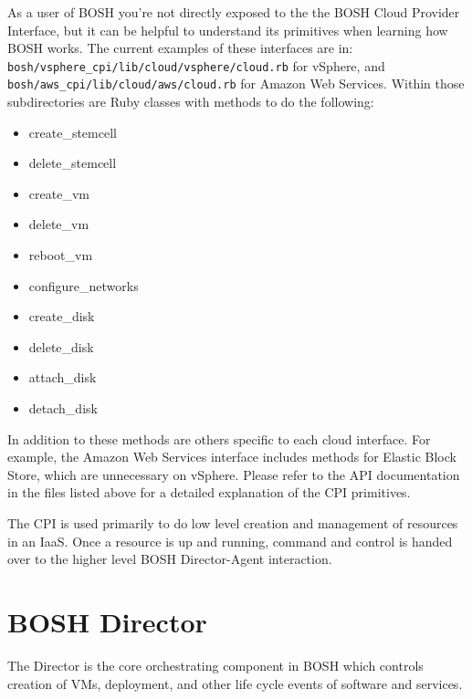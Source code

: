 As a user of BOSH you're not directly exposed to the the BOSH Cloud Provider Interface, but it can be helpful to understand its primitives when learning how BOSH works. The current examples of these interfaces are in: \texttt{bosh\slash vsphere\_cpi\slash lib\slash cloud\slash vsphere\slash cloud.rb} for vSphere, and \texttt{bosh\slash aws\_cpi\slash lib\slash cloud\slash aws\slash cloud.rb} for Amazon Web Services. Within those subdirectories are Ruby classes with methods to do the following: 

\begin{itemize}
\item create\_stemcell

\item delete\_stemcell

\item create\_vm

\item delete\_vm

\item reboot\_vm

\item configure\_networks

\item create\_disk

\item delete\_disk

\item attach\_disk

\item detach\_disk

\end{itemize}

In addition to these methods are others specific to each cloud interface. For example, the Amazon Web Services interface includes methods for Elastic Block Store, which are unnecessary on vSphere. Please refer to the API documentation in the files listed above for a detailed explanation of the CPI primitives.

The CPI is used primarily to do low level creation and management of resources in an IaaS. Once a resource is up and running, command and control is handed over to the higher level BOSH Director-Agent interaction.

\section{BOSH Director}
\label{director}

The Director is the core orchestrating component in BOSH which controls creation of VMs, deployment, and other life cycle events of software and services.

